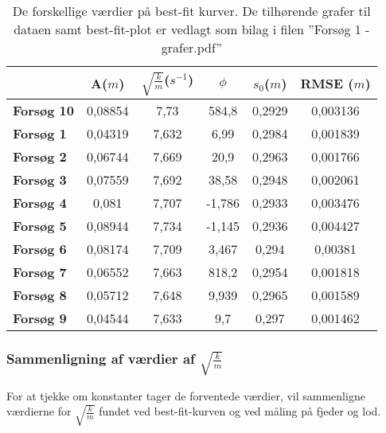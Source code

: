 \begin{table}[h]
\centering
\begin{tabular}{|l|c|c|c|c|c|}
\hline
\textbf{}          & \textbf{A}($m$) & \textbf{$\sqrt{\frac{k}{m}}$}($s^{-1}$) & \textbf{$\phi$} & \textbf{$s_0$}($m$) & \textbf{RMSE }($m$) \\ \hline
\textbf{Forsøg 10} & 0,08854    & 7,73                          & 584,8           & 0,2929         & 0,003136      \\ \hline
\textbf{Forsøg 1}  & 0,04319    & 7,632                         & 6,99            & 0,2984         & 0,001839      \\ \hline
\textbf{Forsøg 2}  & 0,06744    & 7,669                         & 20,9            & 0,2963         & 0,001766      \\ \hline
\textbf{Forsøg 3}  & 0,07559    & 7,692                         & 38,58           & 0,2948         & 0,002061      \\ \hline
\textbf{Forsøg 4}  & 0,081      & 7,707                         & -1,786          & 0,2933         & 0,003476      \\ \hline
\textbf{Forsøg 5}  & 0,08944    & 7,734                         & -1,145          & 0,2936         & 0,004427      \\ \hline
\textbf{Forsøg 6}  & 0,08174    & 7,709                         & 3,467           & 0,294          & 0,00381       \\ \hline
\textbf{Forsøg 7}  & 0,06552    & 7,663                         & 818,2           & 0,2954         & 0,001818      \\ \hline
\textbf{Forsøg 8}  & 0,05712    & 7,648                         & 9,939           & 0,2965         & 0,001589      \\ \hline
\textbf{Forsøg 9}  & 0,04544    & 7,633                         & 9,7             & 0,297          & 0,001462      \\ \hline
\end{tabular}

\caption{De forskellige værdier på best-fit kurver. De tilhørende grafer til dataen samt best-fit-plot er vedlagt som bilag i filen ''Forsøg 1 - grafer.pdf''}
\label{tabel: bestfitkurver forsog 1}
\end{table}

\subsubsection{Sammenligning af værdier af $\sqrt{\frac{k}{m}}$}\label{exp1: teoretisk bestemmelse af sqrt k over m}
For at tjekke om konstanter tager de forventede værdier, vil sammenligne værdierne for $\sqrt{\frac{k}{m}}$ fundet ved best-fit-kurven og ved måling på fjeder og lod.


